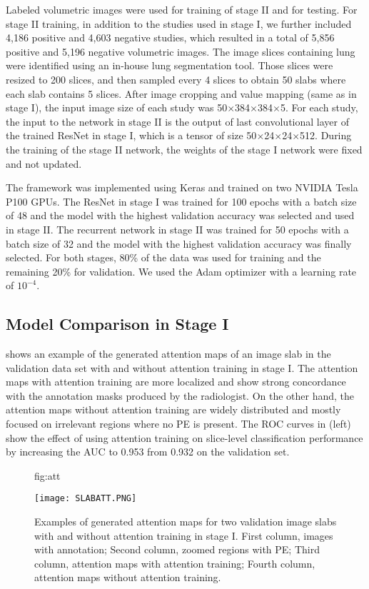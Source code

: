 \documentclass{midl} %
\begin{document}
Labeled volumetric images were used for training of stage II and for testing. For stage II training, in addition to the studies used in stage I, we further included 4,186 positive and 4,603 negative studies, which resulted in a total of 5,856 positive and 5,196 negative volumetric images. The image slices containing lung were identified using an in-house lung segmentation tool. Those slices were resized to 200 slices, and then sampled every 4 slices to obtain 50 slabs where each slab contains 5 slices. After image cropping and value mapping (same as in stage I), the input image size of each study was 50$\times$384$\times$384$\times$5. For each study, the input to the network in stage II is the output of last convolutional layer of the trained ResNet in stage I, which is a tensor of size 50$\times$24$\times$24$\times$512. During the training of the stage II network, the weights of the stage I network were fixed and not updated.

The framework was implemented using Keras and trained on two NVIDIA Tesla P100 GPUs. The ResNet in stage I was trained for 100 epochs with a batch size of 48 and the model with the highest validation accuracy was selected and used in stage II.  The recurrent network in stage II was trained for 50 epochs with a batch size of 32 and the model with the highest validation accuracy was finally selected. For both stages, 80\% of the data was used for training and the remaining 20\% for validation. We used the Adam optimizer with a learning rate of $10^{-4}$.

\subsection{Model Comparison in Stage I}
\label{ssec:comparison}

 shows an example of the generated attention maps of an image slab in the validation data set with and without attention training in stage I. The attention maps with attention training are more localized and show strong concordance with the annotation masks produced by the radiologist. On the other hand, the attention maps without attention training are widely distributed and mostly focused on irrelevant regions where no PE is present. The ROC curves in  (left) show the effect of using attention training on slice-level classification performance by increasing the AUC to 0.953 from 0.932 on the validation set.

\begin{figure}[htbp]
\floatconts
  {fig:att}
  {\caption{Examples of generated attention maps for two validation image slabs with and without attention training in stage I. First column, images with annotation; Second column, zoomed regions with PE; Third column, attention maps with attention training; Fourth column, attention maps without attention training.}}
  {\texttt{[image: SLABATT.PNG]}}
\end{figure}
\end{document}
